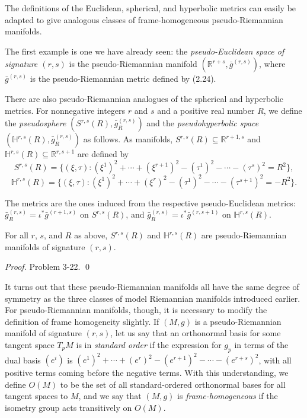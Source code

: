 The definitions of the Euclidean, spherical, and hyperbolic metrics can easily be adapted to give analogous classes of frame-homogeneous pseudo-Riemannian manifolds.

The first example is one we have already seen: the \emph{pseudo-Euclidean space of signature $(r,s)$} is the pseudo-Riemannian manifold $(\mathbb{R}^{r+s}, \bar{g}^{(r,s)})$, where $\bar{g}^{(r,s)}$ is the pseudo-Riemannian metric defined by (2.24).

There are also pseudo-Riemannian analogues of the spherical and hyperbolic metrics. For nonnegative integers $r$ and $s$ and a positive real number $R$, we define the \emph{pseudosphere} $(S^{r,s}(R), \bar{g}_R^{(r,s)})$ and the \emph{pseudohyperbolic space} $(\mathbb{H}^{r,s}(R), \bar{g}_R^{(r,s)})$ as follows. As manifolds, $S^{r,s}(R) \subseteq \mathbb{R}^{r+1,s}$ and $\mathbb{H}^{r,s}(R) \subseteq \mathbb{R}^{r,s+1}$ are defined by
\[
S^{r,s}(R) = \{(\xi, \tau) : (\xi^1)^2 + \cdots + (\xi^{r+1})^2 - (\tau^1)^2 - \cdots - (\tau^s)^2 = R^2\},
\]
\[
\mathbb{H}^{r,s}(R) = \{(\xi, \tau) : (\xi^1)^2 + \cdots + (\xi^r)^2 - (\tau^1)^2 - \cdots - (\tau^{s+1})^2 = -R^2\}.
\]

The metrics are the ones induced from the respective pseudo-Euclidean metrics: $\bar{g}_R^{(r,s)} = \iota^* \bar{g}^{(r+1,s)}$ on $S^{r,s}(R)$, and $\bar{g}_R^{(r,s)} = \iota^* \bar{g}^{(r,s+1)}$ on $\mathbb{H}^{r,s}(R)$.

\begin{theorem}\label{thm:pseudo-riemannian-signature}
For all $r$, $s$, and $R$ as above, $S^{r,s}(R)$ and $\mathbb{H}^{r,s}(R)$ are pseudo-Riemannian manifolds of signature $(r,s)$.
\end{theorem}

\emph{Proof.} Problem 3-22. \qed

It turns out that these pseudo-Riemannian manifolds all have the same degree of symmetry as the three classes of model Riemannian manifolds introduced earlier. For pseudo-Riemannian manifolds, though, it is necessary to modify the definition of frame homogeneity slightly. If $(M,g)$ is a pseudo-Riemannian manifold of signature $(r,s)$, let us say that an orthonormal basis for some tangent space $T_pM$ is in \emph{standard order} if the expression for $g_p$ in terms of the dual basis $(e^i)$ is $(e^1)^2 + \cdots + (e^r)^2 - (e^{r+1})^2 - \cdots - (e^{r+s})^2$, with all positive terms coming before the negative terms. With this understanding, we define $O(M)$ to be the set of all standard-ordered orthonormal bases for all tangent spaces to $M$, and we say that $(M,g)$ is \emph{frame-homogeneous} if the isometry group acts transitively on $O(M)$.

